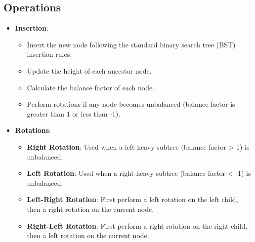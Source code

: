 \documentclass[10pt,a4paper]{article}
\begin{document}
\subsection*{Operations}
\begin{itemize}
    \item \textbf{Insertion}:
    \begin{itemize}
        \item Insert the new node following the standard binary search tree (BST) insertion rules.
        \item Update the height of each ancestor node.
        \item Calculate the balance factor of each node.
        \item Perform rotations if any node becomes unbalanced (balance factor is greater than 1 or less than -1).
    \end{itemize}
    \item \textbf{Rotations}:
    \begin{itemize}
        \item \textbf{Right Rotation}: Used when a left-heavy subtree (balance factor > 1) is unbalanced.
        \item \textbf{Left Rotation}: Used when a right-heavy subtree (balance factor < -1) is unbalanced.
        \item \textbf{Left-Right Rotation}: First perform a left rotation on the left child, then a right rotation on the current node.
        \item \textbf{Right-Left Rotation}: First perform a right rotation on the right child, then a left rotation on the current node.
    \end{itemize}
\end{itemize}
\begin{center}
\end{center}
\end{document}

